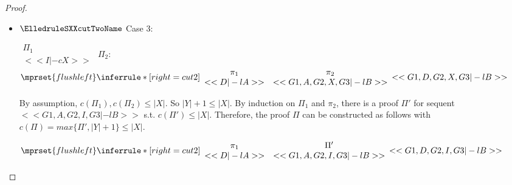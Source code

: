 \begin{proof}
\begin{enumerate}
\begin{itemize}
    \item $\ElledruleSXXcutTwoName$ Case 3:
      \begin{center}
        \scriptsize
        \begin{math}
          \begin{array}{c}
            \Pi_1 \\
            {<<I |-c X>>}
          \end{array}
        \end{math}
        \qquad\qquad
        $\Pi_2$:
        \begin{math}
          $$\mprset{flushleft}
          \inferrule* [right={\tiny cut2}] {
            {
              \begin{array}{cc}
                \pi_1 & \pi_2 \\
                {<<D |-l A>>} & {<<G1, A, G2, X, G3 |-l B>>}
              \end{array}
            }
          }{<<G1, D, G2, X, G3 |-l B>>}
        \end{math}
      \end{center}
      By assumption, $c(\Pi_1),c(\Pi_2)\leq |X|$. So $|Y|+1 \leq |X|$. By induction on $\Pi_1$
      and $\pi_2$, there is a proof $\Pi'$ for sequent $<<G1, A, G2, I, G3 |-l B>>$ s.t.
      $c(\Pi') \leq |X|$. Therefore, the proof $\Pi$ can be constructed as follows with
      $c(\Pi) = max\{\Pi', |Y|+1\} \leq |X|$.
      \begin{center}
        \scriptsize
        \begin{math}
          $$\mprset{flushleft}
          \inferrule* [right={\tiny cut2}] {
            {
              \begin{array}{cc}
                \pi_1 & \Pi' \\
                {<<D |-l A>>} & {<<G1, A, G2, I, G3 |-l B>>}
              \end{array}
            }
          }{<<G1, D, G2, I, G3 |-l B>>}
        \end{math}
      \end{center}


\end{itemize}
\end{enumerate}
\end{proof}
